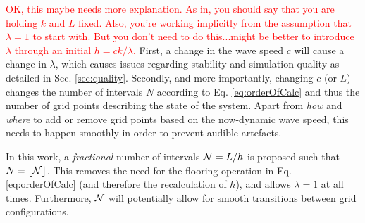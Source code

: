\documentclass[fleqn]{jaes}
\def\SBcomment[#1]{\textcolor{red}{#1}}
\begin{document}
\SBcomment[OK, this maybe needs more explanation. As in, you should say that you are holding $k$ and $L$ fixed. Also, you're working implicitly from the assumption that $\lambda = 1$ to start with. But you don't need to do this...might be better to introduce $\lambda$ through an initial $h = ck/\lambda$.] First, a change in the wave speed $c$ will cause a change in $\lambda$, which causes issues regarding stability and simulation quality as detailed in Sec. \ref{sec:quality}. Secondly, and more importantly, changing $c$ (or $L$) changes the number of intervals $N$ according to Eq. \eqref{eq:orderOfCalc} and thus the number of grid points describing the state of the system. Apart from \textit{how} and \textit{where} to add or remove grid points based on the now-dynamic wave speed, this needs to happen smoothly in order to prevent audible artefacts. %

In this work, a \textit{fractional} number of intervals $\mathcal{N} = L / h$ is proposed such that $N = \floor[\Nfrac]$. This removes the need for the flooring operation in Eq. \eqref{eq:orderOfCalc} (and therefore the recalculation of $h$), and allows $\lambda = 1$ at all times. Furthermore, $\mathcal{N}$ will potentially allow for smooth transitions between grid configurations. 
\end{document}
